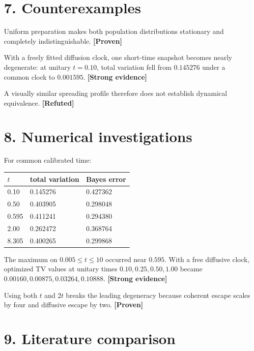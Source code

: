 \documentclass[11pt,a4paper,openany]{report}
\newcommand{\statusProven}{\textcolor{fingreen}{[Proven]}}
\newcommand{\statusStrong}{\textcolor{finblue}{[Strong evidence]}}
\newcommand{\statusRefuted}{\textcolor{finred}{[Refuted]}}
\begin{document}
\section{7. Counterexamples}

Uniform preparation makes both population distributions stationary and completely indistinguishable. \textbf{\statusProven{}}

With a freely fitted diffusion clock, one short-time snapshot becomes nearly degenerate: at unitary \(t=0.10\), total variation fell from \(0.145276\) under a common clock to \(0.001595\). \textbf{\statusStrong{}}

A visually similar spreading profile therefore does not establish dynamical equivalence. \textbf{\statusRefuted{}}

\section{8. Numerical investigations}

For common calibrated time:

\begin{center}
\begingroup\small
\setlength{\tabcolsep}{3.5pt}
\renewcommand{\arraystretch}{1.16}
\begin{longtable}{@{}p{}p{}p{}@{}}
\toprule
\textbf{\(t\)} & \textbf{total variation} & \textbf{Bayes error} \\
\midrule
\endhead
0.10 & 0.145276 & 0.427362 \\
0.50 & 0.403905 & 0.298048 \\
0.595 & 0.411241 & 0.294380 \\
2.00 & 0.262472 & 0.368764 \\
8.305 & 0.400265 & 0.299868 \\
\bottomrule
\end{longtable}
\endgroup
\end{center}

The maximum on \(0.005\le t\le10\) occurred near \(0.595\). With a free diffusive clock, optimized TV values at unitary times \(0.10,0.25,0.50,1.00\) became \(0.00160,0.00875,0.03264,0.10888\). \textbf{\statusStrong{}}

Using both \(t\) and \(2t\) breaks the leading degeneracy because coherent escape scales by four and diffusive escape by two. \textbf{\statusProven{}}

\section{9. Literature comparison}
\end{document}
